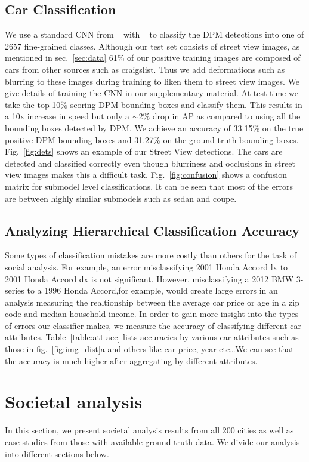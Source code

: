 \documentclass[10pt,twocolumn,letterpaper]{article}
\begin{document}
\subsection{Car Classification}
We use a standard CNN from ~\cite{alexnet} with ~\cite{caffe} to classify the DPM detections into one of 2657 fine-grained classes. Although our test set consists of street view images, as mentioned in sec.~\ref{sec:data} 61\% of our positive training images are composed of cars from other sources such as craigslist. Thus we add deformations such as blurring to these images during training to liken them to street view images. We give details of training the CNN in our supplementary material. At test time we take the top 10\% scoring DPM bounding boxes and classify them. This results in a 10x increase in speed but only a \(\sim\)2\% drop in AP as compared to using all the bounding boxes detected by DPM. We achieve an accuracy of 33.15\% on the true positive DPM bounding boxes and 31.27\% on the ground truth bounding boxes. Fig.~\ref{fig:dets} shows an example of our Street View detections. The cars are detected and classified correctly even though blurriness and occlusions in street view images makes this a difficult task. Fig.~\ref{fig:confusion} shows a confusion matrix for submodel level classifications. It can be seen that most of the errors are between highly similar submodels such as sedan and coupe.   

\subsection{Analyzing Hierarchical Classification Accuracy}
Some types of classification mistakes are more costly than others for the task of social analysis. For example, an error misclassifying 2001 Honda Accord lx to 2001 Honda Accord dx is not significant. However, misclassifying a 2012 BMW 3-series to a 1996 Honda Accord,for example, would create large errors in an analysis measuring the realtionship between the average car price or age in a zip code and median household income. In order to gain more insight into the types of errors our classifier makes, we measure the accuracy of classifying different car attributes. Table~\ref{table:att-acc} lists accuracies by various car attributes such as those in fig.~\ref{fig:img_dist}a and others like car price, year etc\ldots We can see that the accuracy is much higher after aggregating by different attributes.  

 \section{Societal analysis}
\label{sec:social}
In this section, we present societal analysis results from all 200 cities as well as case studies from those with available ground truth data. We divide our analysis into different sections below.
\end{document}
